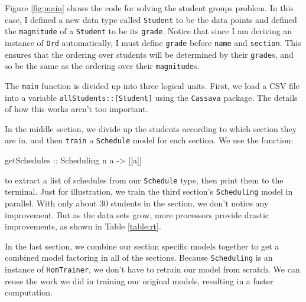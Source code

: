 \documentclass[tikz]{tmr}
\newcommand\h{\lstinline}
\newcommand\+{\mdoubleplus}
\begin{document}
Figure \ref{fig:main} shows the code for solving the student groups problem.
In this case, I defined a new data type called \h{Student} to be the data points and defined the \h{magnitude} of a \h{Student} to be its \h{grade}.
Notice that since I am deriving an instance of \h{Ord} automatically, I must define \h{grade} before \h{name} and \h{section}.
This ensures that the ordering over students will be determined by their \h{grade}s, and so be the same as the ordering over their \h{magnitude}s.

The \h{main} function is divided up into three logical units.
First, we load a CSV file into a variable
\h{allStudents::[Student]}
using the \h{Cassava} package.
The details of how this works aren't too important.

In the middle section, we divide up the students according to which section they are in, and then \h{train} a \h{Schedule} model for each section.
We use the function:
\begin{spec}
getSchedules :: Scheduling n a -> [[a]]
\end{spec}
to extract a list of schedules from our \h{Schedule} type, then print them to the terminal.
Just for illustration, we train the third section's \h{Scheduling} model in parallel.
With only about 30 students in the section, we don't notice any improvement.
But as the data sets grow, more processors provide drastic improvements, as shown in Table \ref{table:rt}.

In the last section, we combine our section specific models together to get a combined model factoring in all of the sections.
Because \h{Scheduling} is an instance of \h{HomTrainer}, we don't have to retrain our model from scratch.
We can reuse the work we did in training our original models, resulting in a faster computation.

\end{document}
